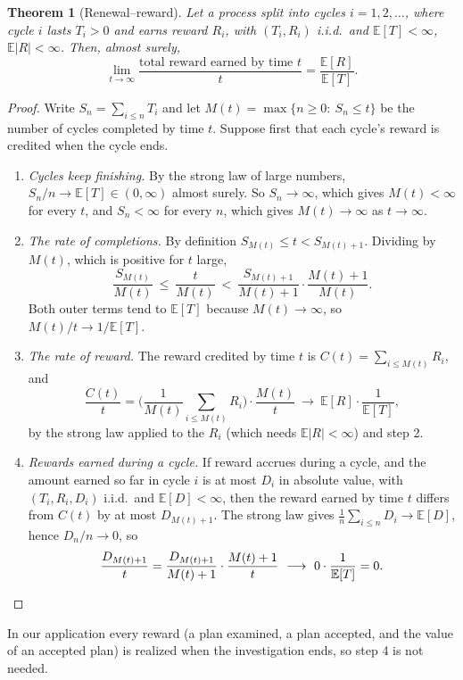 \documentclass[11pt]{article}
\newtheorem*{theorem*}{Theorem}
\theoremstyle{remark}
\newcommand{\E}{\mathbb{E}}
\begin{document}
\begin{theorem*}[Renewal--reward]
Let a process split into cycles $i=1,2,\dots$, where cycle $i$ lasts $T_i>0$ and earns reward $R_i$, with $(T_i,R_i)$ i.i.d.\ and $\E[T]<\infty$, $\E|R|<\infty$. Then, almost surely,
\[
\lim_{t\to\infty}\frac{\text{total reward earned by time }t}{t}=\frac{\E[R]}{\E[T]}.
\]
\end{theorem*}

\begin{proof}
Write $S_n=\sum_{i\le n}T_i$ and let $M(t)=\max\{n\ge0:\ S_n\le t\}$ be the number of cycles completed by time $t$. Suppose first that each cycle's reward is credited when the cycle ends.
\begin{enumerate}
  \item \emph{Cycles keep finishing.} By the strong law of large numbers, $S_n/n\to\E[T]\in(0,\infty)$ almost surely. So $S_n\to\infty$, which gives $M(t)<\infty$ for every $t$, and $S_n<\infty$ for every $n$, which gives $M(t)\to\infty$ as $t\to\infty$.
  \item \emph{The rate of completions.} By definition $S_{M(t)}\le t<S_{M(t)+1}$. Dividing by $M(t)$, which is positive for $t$ large,
  \[
  \frac{S_{M(t)}}{M(t)}\ \le\ \frac{t}{M(t)}\ <\ \frac{S_{M(t)+1}}{M(t)+1}\cdot\frac{M(t)+1}{M(t)}.
  \]
  Both outer terms tend to $\E[T]$ because $M(t)\to\infty$, so $M(t)/t\to1/\E[T]$.
  \item \emph{The rate of reward.} The reward credited by time $t$ is $C(t)=\sum_{i\le M(t)}R_i$, and
  \[
  \frac{C(t)}{t}=\Big(\frac{1}{M(t)}\sum_{i\le M(t)}R_i\Big)\cdot\frac{M(t)}{t}\ \longrightarrow\ \E[R]\cdot\frac{1}{\E[T]},
  \]
  by the strong law applied to the $R_i$ (which needs $\E|R|<\infty$) and step 2.
  \item \emph{Rewards earned during a cycle.} If reward accrues during a cycle, and the amount earned so far in cycle $i$ is at most $D_i$ in absolute value, with $(T_i,R_i,D_i)$ i.i.d.\ and $\E[D]<\infty$, then the reward earned by time $t$ differs from $C(t)$ by at most $D_{M(t)+1}$. The strong law gives $\frac1n\sum_{i\le n}D_i\to\E[D]$, hence $D_n/n\to0$, so
  \[
  \frac{D_{M(t)+1}}{t}=\frac{D_{M(t)+1}}{M(t)+1}\cdot\frac{M(t)+1}{t}\ \longrightarrow\ 0\cdot\frac{1}{\E[T]}=0. \qedhere
  \]
\end{enumerate}
\end{proof}

In our application every reward (a plan examined, a plan accepted, and the value of an accepted plan) is realized when the investigation ends, so step 4 is not needed.
\end{document}
